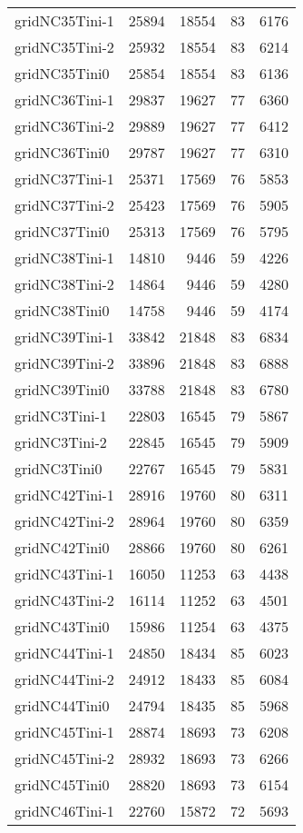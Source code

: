 \begin{longtable}{lrrrr}
gridNC35Tini-1 & 25894 & 18554 & 83 & 6176 \\
gridNC35Tini-2 & 25932 & 18554 & 83 & 6214 \\
gridNC35Tini0 & 25854 & 18554 & 83 & 6136 \\
gridNC36Tini-1 & 29837 & 19627 & 77 & 6360 \\
gridNC36Tini-2 & 29889 & 19627 & 77 & 6412 \\
gridNC36Tini0 & 29787 & 19627 & 77 & 6310 \\
gridNC37Tini-1 & 25371 & 17569 & 76 & 5853 \\
gridNC37Tini-2 & 25423 & 17569 & 76 & 5905 \\
gridNC37Tini0 & 25313 & 17569 & 76 & 5795 \\
gridNC38Tini-1 & 14810 & 9446 & 59 & 4226 \\
gridNC38Tini-2 & 14864 & 9446 & 59 & 4280 \\
gridNC38Tini0 & 14758 & 9446 & 59 & 4174 \\
gridNC39Tini-1 & 33842 & 21848 & 83 & 6834 \\
gridNC39Tini-2 & 33896 & 21848 & 83 & 6888 \\
gridNC39Tini0 & 33788 & 21848 & 83 & 6780 \\
gridNC3Tini-1 & 22803 & 16545 & 79 & 5867 \\
gridNC3Tini-2 & 22845 & 16545 & 79 & 5909 \\
gridNC3Tini0 & 22767 & 16545 & 79 & 5831 \\
gridNC42Tini-1 & 28916 & 19760 & 80 & 6311 \\
gridNC42Tini-2 & 28964 & 19760 & 80 & 6359 \\
gridNC42Tini0 & 28866 & 19760 & 80 & 6261 \\
gridNC43Tini-1 & 16050 & 11253 & 63 & 4438 \\
gridNC43Tini-2 & 16114 & 11252 & 63 & 4501 \\
gridNC43Tini0 & 15986 & 11254 & 63 & 4375 \\
gridNC44Tini-1 & 24850 & 18434 & 85 & 6023 \\
gridNC44Tini-2 & 24912 & 18433 & 85 & 6084 \\
gridNC44Tini0 & 24794 & 18435 & 85 & 5968 \\
gridNC45Tini-1 & 28874 & 18693 & 73 & 6208 \\
gridNC45Tini-2 & 28932 & 18693 & 73 & 6266 \\
gridNC45Tini0 & 28820 & 18693 & 73 & 6154 \\
gridNC46Tini-1 & 22760 & 15872 & 72 & 5693 \\

\end{longtable}
